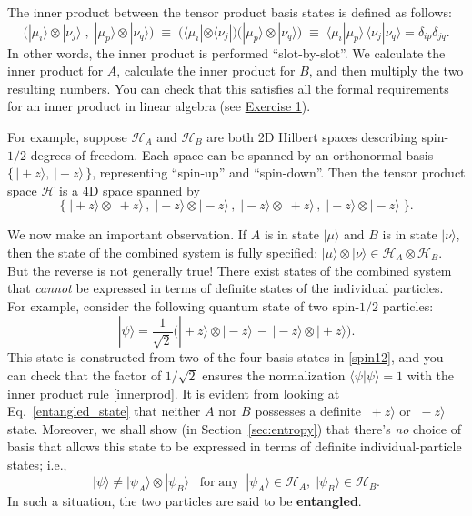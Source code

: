 \documentclass[pra,12pt]{revtex4}
\begin{document}
The inner product between the tensor product basis states is defined
as follows:
\begin{equation}
  \Big(|\mu_i\rangle \otimes |\nu_j\rangle\;,\; |\mu_p\rangle \otimes |\nu_q\rangle \Big) \;\equiv\; \Big(\langle\mu_i| \otimes \langle\nu_j| \Big) \Big(|\mu_p\rangle \otimes |\nu_q\rangle\Big) \;\equiv\; \langle\mu_i|\mu_p\rangle \, \langle\nu_j|\nu_q\rangle = \delta_{ip}\delta_{jq}.
  \label{innerprod}
\end{equation}
In other words, the inner product is performed ``slot-by-slot''.  We
calculate the inner product for $A$, calculate the inner product for
$B$, and then multiply the two resulting numbers.  You can check that
this satisfies all the formal requirements for an inner product in
linear algebra (see \hyperref[ex:innerprod]{Exercise 1}).

For example, suppose $\mathscr{H}_A$ and $\mathscr{H}_B$ are both 2D
Hilbert spaces describing spin-$1/2$ degrees of freedom.  Each space
can be spanned by an orthonormal basis $\{\,|\!+\!z\rangle,
\,|\!-\!z\rangle \, \}$, representing ``spin-up'' and ``spin-down''.
Then the tensor product space $\mathscr{H}$ is a 4D space spanned by
\begin{equation}
  \Big\{\;|\!+\!z\rangle\otimes|\!+\!z\rangle\,,\; |\!+\!z\rangle\otimes|\!-\!z\rangle\,,\; |\!-z\!\rangle\otimes|\!+\!z\rangle\,,\; |\!-\!z\rangle\otimes|\!-\!z\rangle \;\Big\}.
  \label{spin12}
\end{equation}

We now make an important observation.  If $A$ is in state
$|\mu\rangle$ and $B$ is in state $|\nu\rangle$, then the state of the
combined system is fully specified: $|\mu\rangle \otimes |\nu\rangle
\in \mathscr{H}_A \otimes \mathscr{H}_B$.  But the reverse is not
generally true!  There exist states of the combined system that
\textit{cannot} be expressed in terms of definite states of the
individual particles.  For example, consider the following quantum
state of two spin-$1/2$ particles:
\begin{equation}
  |\psi\rangle = \frac{1}{\sqrt{2}} \Big(|\!+\!z\rangle\otimes|\!-\!z\rangle \,-\, |\!-\!z\rangle\otimes|\!+\!z\rangle\Big).
  \label{entangled_state}
\end{equation}
This state is constructed from two of the four basis states in
\eqref{spin12}, and you can check that the factor of $1/\sqrt{2}$
ensures the normalization $\langle\psi|\psi\rangle = 1$ with the inner
product rule \eqref{innerprod}.  It is evident from looking at
Eq.~\eqref{entangled_state} that neither $A$ nor $B$ possesses a
definite $|\!+\!z\rangle$ or $|\!-\!z\rangle$ state.  Moreover, we
shall show (in Section~\ref{sec:entropy}) that there's \textit{no}
choice of basis that allows this state to be expressed in terms of
definite individual-particle states; i.e.,
\begin{equation}
  |\psi\rangle \ne |\psi_A\rangle\otimes|\psi_B\rangle \;\;\;\textrm{for}\;\textrm{any}\;\; |\psi_A\rangle \in \mathscr{H}_A, \;|\psi_B\rangle \in \mathscr{H}_B.
\end{equation}
In such a situation, the two particles are said to be
\textbf{entangled}.
\end{document}
